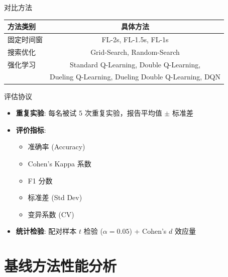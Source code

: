 \begin{frame}{对比方法}
    \begin{table}[h]
        \centering
        \footnotesize
        \begin{tabular}{l|c}
            \hline
            \textbf{方法类别} & \textbf{具体方法} \\
            \hline
            固定时间窗 & FL-2s, FL-1.5s, FL-1s \\
            搜索优化 & Grid-Search, Random-Search \\
            强化学习 & Standard Q-Learning, Double Q-Learning, \\
            & Dueling Q-Learning, Dueling Double Q-Learning, DQN \\
            \hline
        \end{tabular}
    \end{table}
\end{frame}

\begin{frame}{评估协议}
    \begin{itemize}
        \item \textbf{重复实验}: 每名被试 5 次重复实验，报告平均值 $\pm$ 标准差
        \item \textbf{评价指标}:
        \begin{itemize}
            \item 准确率 (Accuracy)
            \item Cohen's Kappa 系数
            \item F1 分数
            \item 标准差 (Std Dev)
            \item 变异系数 (CV)
        \end{itemize}
        \item \textbf{统计检验}: 配对样本 $t$ 检验 ($\alpha = 0.05$) + Cohen's $d$ 效应量
    \end{itemize}
\end{frame}

\section{基线方法性能分析}

